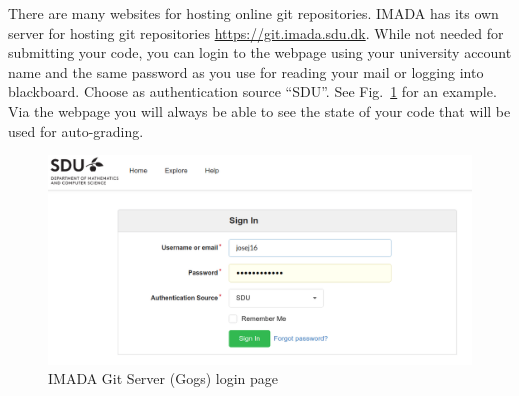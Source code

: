 There are many websites for hosting online git repositories. IMADA has its own server for hosting git repositories  \url{https://git.imada.sdu.dk}. While not needed for submitting your code, you can login to the webpage using your university account name and the same password as you use for reading your mail or logging into blackboard. Choose as authentication source ``SDU''. See Fig.~\ref{fig:gogs} for an example. Via the webpage you will always be able to see the state of your code that will be used for auto-grading.

\begin{figure}
  \includegraphics[width=\textwidth]{gogs}
  \caption{IMADA Git Server (Gogs) login page}
  \label{fig:gogs}
\end{figure}

